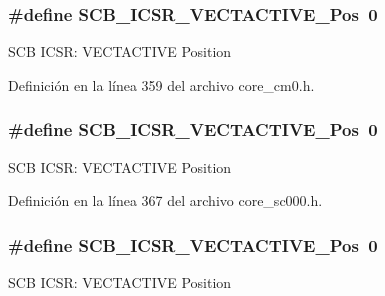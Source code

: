 \subsubsection[{\texorpdfstring{S\+C\+B\+\_\+\+I\+C\+S\+R\+\_\+\+V\+E\+C\+T\+A\+C\+T\+I\+V\+E\+\_\+\+Pos}{SCB_ICSR_VECTACTIVE_Pos}}]{\setlength{\rightskip}{0pt plus 5cm}\#define S\+C\+B\+\_\+\+I\+C\+S\+R\+\_\+\+V\+E\+C\+T\+A\+C\+T\+I\+V\+E\+\_\+\+Pos~0}\hypertarget{group___c_m_s_i_s___s_c_b_gae4f602c7c5c895d5fb687b71b0979fc3}{}\label{group___c_m_s_i_s___s_c_b_gae4f602c7c5c895d5fb687b71b0979fc3}
S\+CB I\+C\+SR\+: V\+E\+C\+T\+A\+C\+T\+I\+VE Position 

Definición en la línea 359 del archivo core\+\_\+cm0.\+h.

\subsubsection[{\texorpdfstring{S\+C\+B\+\_\+\+I\+C\+S\+R\+\_\+\+V\+E\+C\+T\+A\+C\+T\+I\+V\+E\+\_\+\+Pos}{SCB_ICSR_VECTACTIVE_Pos}}]{\setlength{\rightskip}{0pt plus 5cm}\#define S\+C\+B\+\_\+\+I\+C\+S\+R\+\_\+\+V\+E\+C\+T\+A\+C\+T\+I\+V\+E\+\_\+\+Pos~0}\hypertarget{group___c_m_s_i_s___s_c_b_gae4f602c7c5c895d5fb687b71b0979fc3}{}\label{group___c_m_s_i_s___s_c_b_gae4f602c7c5c895d5fb687b71b0979fc3}
S\+CB I\+C\+SR\+: V\+E\+C\+T\+A\+C\+T\+I\+VE Position 

Definición en la línea 367 del archivo core\+\_\+sc000.\+h.

\subsubsection[{\texorpdfstring{S\+C\+B\+\_\+\+I\+C\+S\+R\+\_\+\+V\+E\+C\+T\+A\+C\+T\+I\+V\+E\+\_\+\+Pos}{SCB_ICSR_VECTACTIVE_Pos}}]{\setlength{\rightskip}{0pt plus 5cm}\#define S\+C\+B\+\_\+\+I\+C\+S\+R\+\_\+\+V\+E\+C\+T\+A\+C\+T\+I\+V\+E\+\_\+\+Pos~0}\hypertarget{group___c_m_s_i_s___s_c_b_gae4f602c7c5c895d5fb687b71b0979fc3}{}\label{group___c_m_s_i_s___s_c_b_gae4f602c7c5c895d5fb687b71b0979fc3}
S\+CB I\+C\+SR\+: V\+E\+C\+T\+A\+C\+T\+I\+VE Position 

